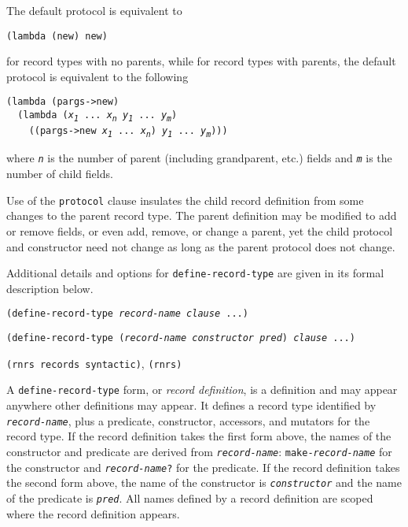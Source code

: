 \label{records_s12}The default protocol is equivalent to


\texttt{(lambda (new) new)}

for record types with no parents, while for record types with parents,
the default protocol is equivalent to the following


\begin{alltt}
(lambda (pargs-\textgreater{}new)
  (lambda (\textit{x\textsubscript{1}} ... \textit{x\textsubscript{n}} \textit{y\textsubscript{1}} ... \textit{y\textsubscript{m}})
    ((pargs-\textgreater{}new \textit{x\textsubscript{1}} ... \textit{x\textsubscript{n}}) \textit{y\textsubscript{1}} ... \textit{y\textsubscript{m}})))
\end{alltt}


where \texttt{\textit{n}} is the number of parent (including grandparent, etc.) fields
and \texttt{\textit{m}} is the number of child fields.


Use of the \texttt{protocol} clause insulates the child record definition
from some changes to the parent record type.
The parent definition may be modified to add or remove fields, or even
add, remove, or change a parent, yet the child protocol and constructor
need not change as long as the parent protocol does not change.


Additional details and options for \texttt{define-record-type} are given in
its formal description below.


\begin{description}

\label{records_s13}\item[syntax] \texttt{(define-record-type \textit{record-name} \textit{clause} ...)}



\item[syntax] \texttt{(define-record-type (\textit{record-name} \textit{constructor} \textit{pred}) \textit{clause} ...)}



\item[libraries] \texttt{(rnrs records syntactic)}, \texttt{(rnrs)}
\end{description}


A \texttt{define-record-type} form, or \textit{record definition}, is a definition
and may appear anywhere other definitions may appear.
It defines a record
type identified by \texttt{\textit{record-name}}, plus a predicate, constructor, accessors,
and mutators for the record type.
If the record definition takes the first form above, the names of the constructor
and predicate are derived from \texttt{\textit{record-name}}: \texttt{make-\textit{record-name}}
for the constructor and \texttt{\textit{record-name}?} for the predicate.
If the record definition takes the second form above, the name of the constructor
is \texttt{\textit{constructor}} and the name of the predicate is \texttt{\textit{pred}}.
All names defined by a record definition are scoped where the record definition
appears.


